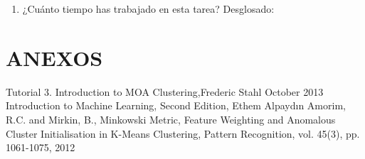 \documentclass[10pt,a4paper]{article}
\begin{document}
\begin{enumerate}

%	
%

	\item  ¿Cuánto tiempo has trabajado en esta tarea? Desglosado:

		\begin{table}[H]
		\centering
		\end{table}

%

\end{enumerate} 

\newpage

\section*{ANEXOS}

\newpage



\newpage



\newpage

\begin{thebibliography}{X}
	 Tutorial 3. Introduction to MOA Clustering,Frederic Stahl
October 2013
	 Introduction to Machine Learning, Second Edition, Ethem
	Alpaydın
	 Amorim, R.C. and Mirkin, B., Minkowski
	Metric, Feature Weighting and Anomalous Cluster Initialisation in K-Means Clustering, Pattern Recognition, vol. 45(3), pp. 1061-1075, 2012
\end{thebibliography}

\end{document}
